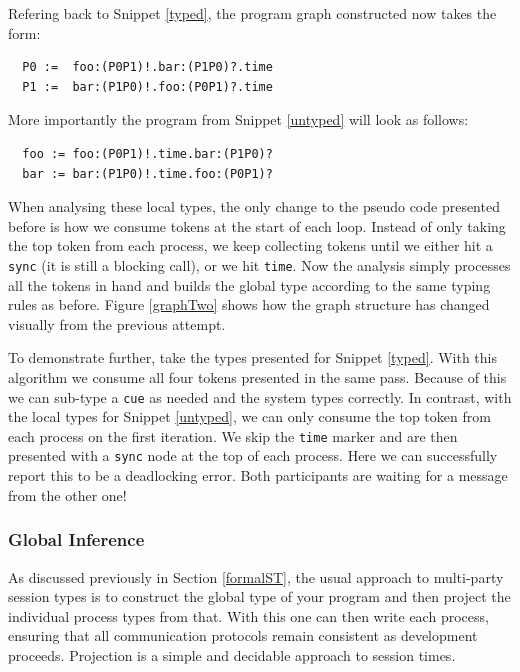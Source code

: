 \documentclass[11pt, abstracton, twoside, titlepage=true]{scrartcl}
\begin{document}
Refering back to Snippet \ref{typed}, the program graph constructed now takes
the form:
\\
\begin{lstlisting}
  P0 :=  foo:(P0P1)!.bar:(P1P0)?.time
  P1 :=  bar:(P1P0)!.foo:(P0P1)?.time
\end{lstlisting}

More importantly the program from Snippet \ref{untyped} will look as follows:
\\
\begin{lstlisting}
  foo := foo:(P0P1)!.time.bar:(P1P0)?
  bar := bar:(P1P0)!.time.foo:(P0P1)?
\end{lstlisting}

When analysing these local types, the only change to the pseudo code presented before 
is how we consume tokens at the start of each loop. Instead of only taking the 
top token from each process, we keep collecting tokens until we either hit a 
\texttt{sync} (it is still a blocking call), or we hit \texttt{time}. Now the analysis 
simply processes all the tokens in hand and builds the global type according to the 
same typing rules as before. Figure \ref{graphTwo} shows how the graph structure 
has changed visually from the previous attempt.

To demonstrate further, take the types presented for Snippet \ref{typed}. With this 
algorithm we consume all four tokens presented in the same pass. Because of this we 
can sub-type a \texttt{cue} as needed and the system types correctly. In contrast, 
with the local types for Snippet \ref{untyped}, we can only consume the top token 
from each process on the first iteration. We skip the \texttt{time} marker and are 
then presented with a \texttt{sync} node at the top of each process. Here we can 
successfully report this to be a deadlocking error. Both participants are waiting for a 
message from the other one!


\subsubsection{Global Inference}
As discussed previously in Section \ref{formalST}, the usual approach to multi-party 
session types is to construct the global type of your program and then project the 
individual process types from that. With this one can then write each process, 
ensuring that all communication protocols remain consistent as development proceeds. 
Projection is a simple and decidable approach to session times.
\end{document}
